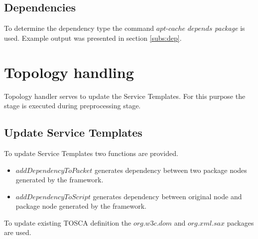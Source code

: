 \subsection*{Dependencies}
To determine the dependency type the command $apt$-$cache$ $depends$  \emph{package} is used.
Example output was presented in section \ref{subs:dep}.

\section{Topology handling}
Topology handler serves to update the Service Templates.
For this purpose the  stage is executed during preprocessing stage.

\subsection*{Update Service Templates}
To update Service Templates two functions are provided.
\begin{itemize}
	\item $addDependencyToPacket$ generates dependency between two package nodes generated by the framework.
	\item $addDependencyToScript$ generates dependency between original node and package node generated by the framework.
	 
\end{itemize} 
To update existing TOSCA definition the $org$.$w3c$.$dom$ and $org$.$xml$.$sax$ packages are used.
